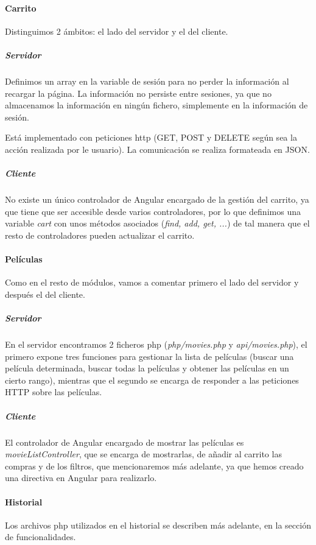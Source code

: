 \documentclass{apuntes}
\begin{document}
\label{CriterioPHP}

\paragraph{Carrito}

Distinguimos 2 ámbitos: el lado del servidor y el del cliente. \label{Carrito}

\subparagraph{Servidor}


Definimos un array en la variable de sesión para no perder la información al recargar la página. La información no persiste entre sesiones, ya que no almacenamos la información en ningún fichero, simplemente en la información de sesión.

Está implementado con peticiones http (GET, POST y DELETE según sea la acción realizada por le usuario). La comunicación se realiza formateada en JSON.

\subparagraph{Cliente}

No existe un único controlador de Angular encargado de la gestión del carrito, ya que tiene que ser accesible desde varios controladores, por lo que definimos una variable \textit{cart} con unos métodos asociados (\textit{find, add, get, ...}) de tal manera que el resto de controladores pueden actualizar el carrito.

\paragraph{Películas}

Como en el resto de módulos, vamos a comentar primero el lado del servidor y después el del cliente.

\subparagraph{Servidor}
En el servidor encontramos 2 ficheros php (\textit{php/movies.php} y \textit{api/movies.php}), el primero expone tres funciones para gestionar la lista de películas (buscar una película determinada, buscar todas la películas y obtener las películas en un cierto rango), mientras que el segundo se encarga de responder a las peticiones HTTP sobre las películas.

\subparagraph{Cliente}
El controlador de Angular encargado de mostrar las películas es \textit{movieListController}, que se encarga de mostrarlas, de añadir al carrito las compras y de los filtros, que mencionaremos más adelante, ya que hemos creado una directiva en Angular para realizarlo.


\paragraph{Historial} Los archivos php utilizados en el historial se describen más adelante, en la sección de funcionalidades.
\end{document}

